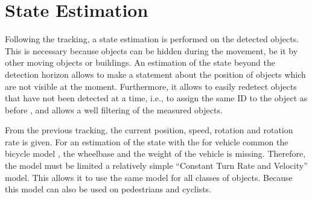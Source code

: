 \documentclass[11pt,oneside,openright]{mpreport}
\begin{document}
%     
%   


\section{State Estimation}
Following the tracking, a state estimation is performed on the detected objects. This is necessary because objects can be hidden during the movement,
be it by other moving objects or buildings. An estimation of the state beyond the detection horizon allows to make a statement about the position of 
objects which are not visible at the moment. Furthermore, it allows to easily redetect objects that have not been detected at a time, i.e., to assign the same ID to the object as before
, and allows a well filtering of the measured objects.


From the previous tracking, the current position, speed, rotation and rotation rate is given. For an estimation of the state with the for vehicle common the bicycle model \cite{althoff2014online,snider2009automatic,kong2015kinematic}, 
the wheelbase and the weight of the vehicle is missing. Therefore, the model must be limited a relatively simple ``Constant Turn Rate and Velocity'' model.
This allows it to use the same model for all classes of objects. Because this model can also be used on pedestrians and cyclists.
\end{document}
